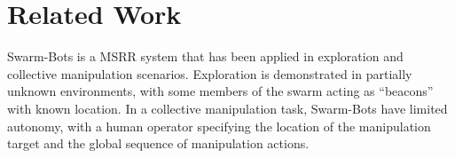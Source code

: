 \documentclass[conference]{IEEEtran}
\begin{document}



\section{Related Work}\label{sec:related-work}
%
%




Swarm-Bots is a MSRR system that has been applied in exploration \cite{Dorigo2005} and collective manipulation \cite{Mondada2005} scenarios.  Exploration is demonstrated in partially unknown environments, with some members of the swarm acting as ``beacons'' with known location.  In a collective manipulation task, Swarm-Bots have limited autonomy, with a human operator specifying the location of the manipulation target and the global sequence of manipulation actions.
\end{document}
